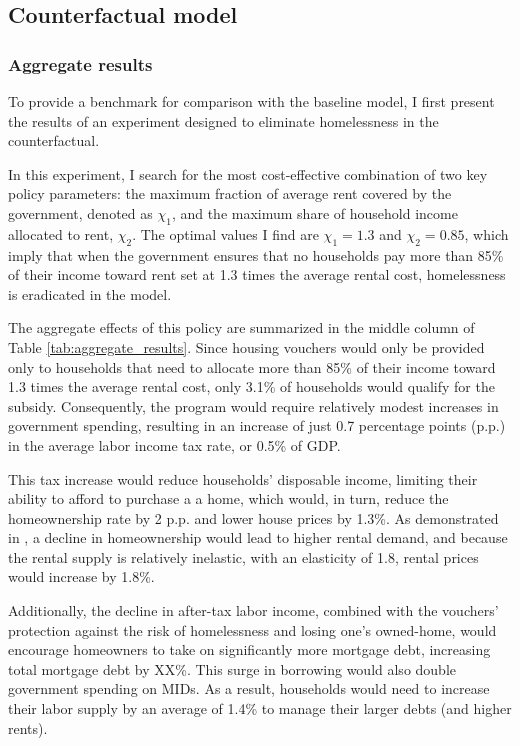 \documentclass[parskip=full]{article}
\begin{document}
\subsection{Counterfactual model}

\subsubsection{Aggregate results}

To provide a benchmark for comparison with the baseline model, I first present the results of an experiment designed to eliminate homelessness in the counterfactual.

In this experiment, I search for the most cost-effective combination of two key policy parameters: the maximum fraction of average rent covered by the government, denoted as $\chi_{1}$, and the maximum share of household income allocated to rent, $\chi_{2}$. The optimal values I find are $\chi_{1} = 1.3$ and $\chi_{2} = 0.85$, which imply that when the government ensures that no households pay more than 85\% of their income toward rent set at 1.3 times the average rental cost, homelessness is eradicated in the model.

The aggregate effects of this policy are summarized in the middle column of Table \ref{tab:aggregate_results}. Since housing vouchers would only be provided only to households that need to allocate more than 85\% of their income toward 1.3 times the average rental cost, only 3.1\% of households would qualify for the subsidy. Consequently, the program would require relatively modest increases in government spending, resulting in an increase of just 0.7 percentage points (p.p.) in the average labor income tax rate, or 0.5\% of GDP.

This tax increase would reduce households' disposable income, limiting their ability to afford to purchase a a home, which would, in turn, reduce the homeownership rate by 2 p.p. and lower house prices by 1.3\%. As demonstrated in \citet{rs-2023}, a decline in homeownership would lead to higher rental demand, and because the rental supply is relatively inelastic, with an elasticity of 1.8, rental prices would increase by 1.8\%.

Additionally, the decline in after-tax labor income, combined with the vouchers' protection against the risk of homelessness and losing one's owned-home, would encourage homeowners to take on significantly more mortgage debt, increasing total mortgage debt by XX\%. This surge in borrowing would also double government spending on MIDs. As a result, households would need to increase their labor supply by an average of 1.4\% to manage their larger debts (and higher rents).
\end{document}
